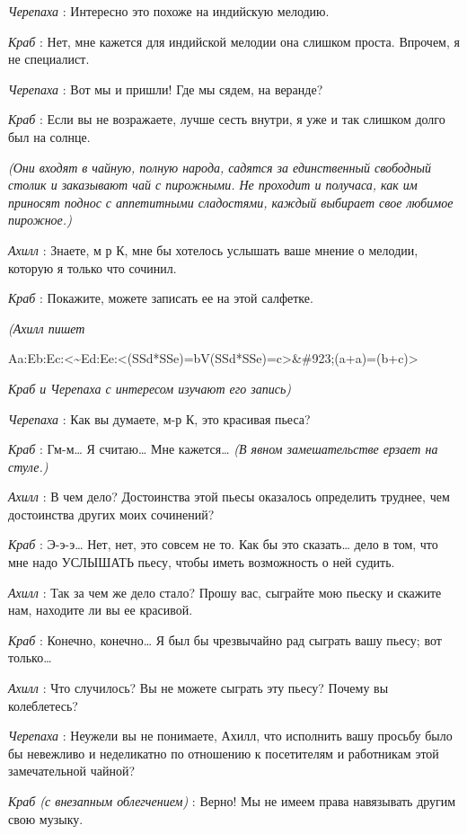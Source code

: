 \emph{Черепаха} : Интересно это похоже на индийскую мелодию.

\emph{Краб} : Нет, мне кажется для индийской мелодии она слишком проста. Впрочем, я не специалист.

\emph{Черепаха} : Вот мы и пришли! Где мы сядем, на веранде?

\emph{Краб} : Если вы не возражаете, лучше сесть внутри, я уже и так слишком долго был на солнце.

\emph{(Они входят в чайную, полную народа, садятся за единственный свободный столик и заказывают чай с пирожными. Не проходит и получаса, как им приносят поднос с аппетитными сладостями, каждый выбирает свое любимое пирожное.)}

\emph{Ахилл} : Знаете, м р К, мне бы хотелось услышать ваше мнение о мелодии, которую я только что сочинил.

\emph{Краб} : Покажите, можете записать ее на этой салфетке.

\emph{(Ахилл пишет}

Aa:Eb:Ec:\textless\textasciitilde Ed:Ee:\textless(SSd*SSe)=bV(SSd*SSe)=c\textgreater\&\#923;(a+a)=(b+c)\textgreater{}

\emph{Краб и Черепаха с интересом изучают его запись)}

\emph{Черепаха} : Как вы думаете, м-р К, это красивая пьеса?

\emph{Краб} : Гм-м\ldots{} Я считаю\ldots{} Мне кажется\ldots{} \emph{(В явном замешательстве ерзает на стуле.)}

\emph{Ахилл} : В чем дело? Достоинства этой пьесы оказалось определить труднее, чем достоинства других моих сочинений?

\emph{Краб} : Э-э-э\ldots{} Нет, нет, это совсем не то. Как бы это сказать\ldots{} дело в том, что мне надо УСЛЫШАТЬ пьесу, чтобы иметь возможность о ней судить.

\emph{Ахилл} : Так за чем же дело стало? Прошу вас, сыграйте мою пьеску и скажите нам, находите ли вы ее красивой.

\emph{Краб} : Конечно, конечно\ldots{} Я был бы чрезвычайно рад сыграть вашу пьесу; вот только\ldots{}

\emph{Ахилл} : Что случилось? Вы не можете сыграть эту пьесу? Почему вы колеблетесь?

\emph{Черепаха} : Неужели вы не понимаете, Ахилл, что исполнить вашу просьбу было бы невежливо и неделикатно по отношению к посетителям и работникам этой замечательной чайной?

\emph{Краб (с внезапным облегчением)} : Верно! Мы не имеем права навязывать другим свою музыку.

